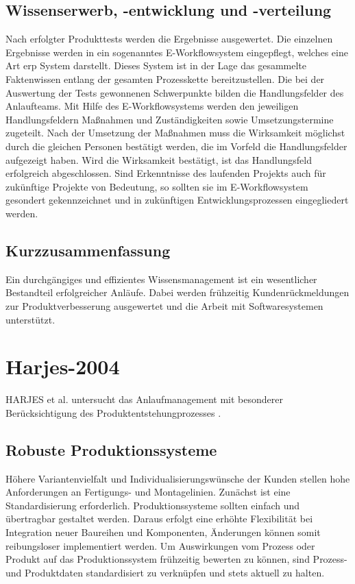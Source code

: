 \subsection{Wissenserwerb, -entwicklung und -verteilung}
Nach erfolgter Produkttests werden die Ergebnisse ausgewertet. Die einzelnen Ergebnisse werden in ein sogenanntes E-Workflowsystem eingepflegt, welches eine Art \gls{erp} System darstellt.
Dieses System ist in der Lage das gesammelte Faktenwissen entlang der gesamten Prozesskette bereitzustellen. Die bei der Auswertung der Tests gewonnenen Schwerpunkte bilden die Handlungsfelder des Anlaufteams. Mit Hilfe des E-Workflowsystems werden den jeweiligen Handlungsfeldern Maßnahmen und Zuständigkeiten sowie Umsetzungstermine zugeteilt. 
Nach der Umsetzung der Maßnahmen muss die Wirksamkeit möglichst durch die gleichen Personen bestätigt werden, die im Vorfeld die Handlungsfelder aufgezeigt haben. Wird die Wirksamkeit bestätigt, ist das Handlungsfeld erfolgreich abgeschlossen. 
Sind Erkenntnisse des laufenden Projekts auch für zukünftige Projekte von Bedeutung, so sollten sie im E-Workflowsystem gesondert gekennzeichnet und in zukünftigen Entwicklungsprozessen eingegliedert werden. 


\subsection{Kurzzusammenfassung}

Ein durchgängiges und effizientes Wissensmanagement ist ein wesentlicher Bestandteil erfolgreicher Anläufe. Dabei werden frühzeitig Kundenrückmeldungen zur Produktverbesserung ausgewertet und die Arbeit mit Softwaresystemen unterstützt. 

\section{Harjes-2004}

HARJES et al. untersucht das Anlaufmanagement mit besonderer Berücksichtigung des Produktentstehungprozesses \cite{Harjes2004}. 

\subsection{Robuste Produktionssysteme}

Höhere Variantenvielfalt und Individualisierungswünsche der Kunden stellen hohe Anforderungen an Fertigungs- und Montagelinien. Zunächst ist eine Standardisierung erforderlich. Produktionssysteme sollten einfach und übertragbar gestaltet werden. Daraus erfolgt eine erhöhte Flexibilität bei Integration neuer Baureihen und Komponenten, Änderungen können somit reibungsloser implementiert werden. Um Auswirkungen vom Prozess oder Produkt auf das Produktionssystem frühzeitig bewerten zu können, sind Prozess- und Produktdaten standardisiert zu verknüpfen und stets aktuell zu halten. 

